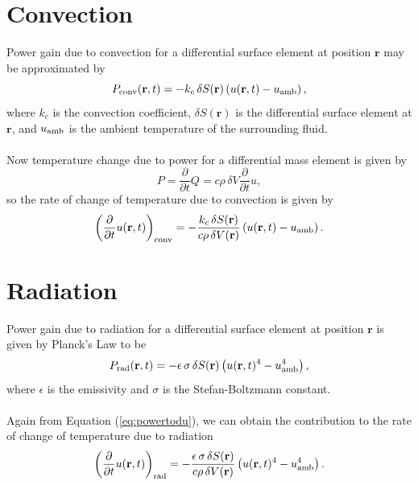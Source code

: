 \documentclass[letterpaper,titlepage,oneside]{report}
\begin{document}
\section{Convection}
Power gain due to convection for a differential surface element
at position $\mathbf{r}$ may be approximated by
\begin{equation}\label{eq:convectionpower}
  P_{\rm{conv}}(\mathbf{r},t) = -k_c\,\delta S(\mathbf{r})
  \left(u(\mathbf{r},t)-u_{\rm{amb}}\right),
\end{equation}
where $k_c$ is the convection coefficient, $\delta S(\mathbf{r})$ is
the differential surface element at $\mathbf{r}$, and $u_{\rm{amb}}$ is
the ambient temperature of the surrounding fluid.
\\\\
Now temperature change due to power for a differential mass element
is given by
\begin{equation}\label{eq:powertodu}
  P = \frac{\partial}{\partial t}Q = c\rho\,\delta V\frac{\partial}{\partial t}u,
\end{equation}
so the rate of change of temperature due to convection is given by
\begin{equation}\label{eq:duconvection}
  \left(\frac{\partial}{\partial t}u(\mathbf{r},t)\right)_{\rm{conv}} =
  -\frac{k_c\,\delta S(\mathbf{r})}{c\rho\,\delta V(\mathbf{r})}
  \left(u(\mathbf{r},t)-u_{\rm{amb}}\right).
\end{equation}

\section{Radiation}
Power gain due to radiation for a differential surface element at
position $\mathbf{r}$ is given by Planck's Law to be
\begin{equation}\label{eq:radiationpower}
  P_{\rm{rad}}(\mathbf{r},t) = -\epsilon\,\sigma\,\delta S(\mathbf{r})
  \left(u(\mathbf{r},t)^4-u_{\rm{amb}}^4\right),
\end{equation}
where $\epsilon$ is the emissivity and $\sigma$ is the Stefan-Boltzmann
constant.
\\\\
Again from Equation (\ref{eq:powertodu}), we can obtain the contribution
to the rate of change of temperature due to radiation
\begin{equation}\label{eq:duradiation}
  \left(\frac{\partial}{\partial t}u(\mathbf{r},t)\right)_{\rm{rad}} =
  -\frac{\epsilon\,\sigma\,\delta S(\mathbf{r})}{c\rho\,\delta V(\mathbf{r})}
  \left(u(\mathbf{r},t)^4-u_{\rm{amb}}^4\right).
\end{equation}
\end{document}

